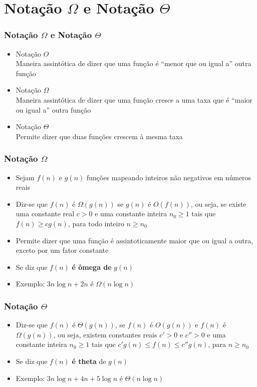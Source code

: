 \documentclass[aspectratio=169]{beamer}
\begin{document}
\section{Notação $\Omega$ e Notação $\Theta$}

\begin{frame}\frametitle{Notação $\Omega$ e Notação $\Theta$}
\begin{itemize}
	\item Notação $O$\\
	Maneira assintótica de dizer que uma função é ``menor que ou igual a'' outra função
	\item Notação $\Omega$\\
	Maneira assintótica de dizer que uma função cresce a uma taxa que é ``maior ou igual a'' outra função
	\item Notação $\Theta$\\
	Permite dizer que duas funções crescem à mesma taxa
	\end{itemize}
\end{frame}

\begin{frame}\frametitle{Notação $\Omega$}
\begin{itemize}
	\item Sejam $f(n)$ e $g(n)$ funções mapeando inteiros não negativos em números reais
	\item Diz-se que $f(n)$ é $\Omega(g(n))$ se $g(n)$ é $O(f(n))$, ou seja, se existe uma constante real $c > 0$ e uma constante inteira $n_0 \ge 1$ tais que $f(n) \ge cg(n)$, para todo inteiro $n \ge n_0$
	\item Permite dizer que uma função é assintoticamente maior que ou igual a outra, exceto por um fator constante
	\item Se diz que $f(n)$ \textbf{é ômega de} $g(n)$
	\item Exemplo: $3n\log{n} + 2n$ é $\Omega(n\log{n})$
\end{itemize}
\end{frame}

\begin{frame}\frametitle{Notação $\Theta$}
\begin{itemize}
	\item Diz-se que $f(n)$ é $\Theta(g(n))$, se $f(n)$ é $O(g(n))$ e $f(n)$ é $\Omega(g(n))$, ou seja, existem constantes reais $c' > 0$ e $c'' > 0$ e uma constante inteira $n_0 \ge 1$ tais que $c'g(n) \le f(n) \le c''g(n)$, para $n \ge n_0$
	\item Se diz que $f(n)$ \textbf{é theta} de $g(n)$
	\item Exemplo: $3n\log{n} + 4n + 5 \log{n}$ é $\Theta(n\log{n})$
\end{itemize}
\end{frame}
\end{document}
